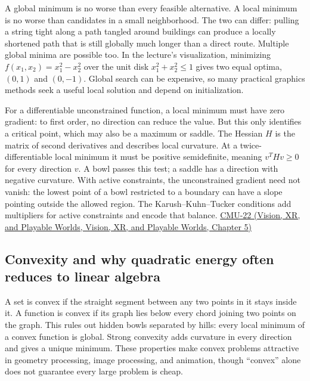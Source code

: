 A global minimum is no worse than every feasible alternative. A local minimum is no worse than candidates in a small neighborhood. The two can differ: pulling a string tight along a path tangled around buildings can produce a locally shortened path that is still globally much longer than a direct route. Multiple global minima are possible too. In the lecture's visualization, minimizing \(f(x_1,x_2)=x_1^2-x_2^2\) over the unit disk \(x_1^2+x_2^2\le1\) gives two equal optima, \((0,1)\) and \((0,-1)\). Global search can be expensive, so many practical graphics methods seek a useful local solution and depend on initialization.

For a differentiable unconstrained function, a local minimum must have zero gradient: to first order, no direction can reduce the value. But this only identifies a critical point, which may also be a maximum or saddle. The Hessian \(H\) is the matrix of second derivatives and describes local curvature. At a twice-differentiable local minimum it must be positive semidefinite, meaning \(v^T H v\ge0\) for every direction \(v\). A bowl passes this test; a saddle has a direction with negative curvature. With active constraints, the unconstrained gradient need not vanish: the lowest point of a bowl restricted to a boundary can have a slope pointing outside the allowed region. The Karush--Kuhn--Tucker conditions add multipliers for active constraints and encode that balance. \href{../07-Vision-XR-and-Playable-Worlds/main.pdf\#nameddest=04-visual-computing-ii-ch036-cmu-22---optimization}{CMU-22 (Vision, XR, and Playable Worlds, Vision, XR, and Playable Worlds, Chapter 5)}

\subsection{Convexity and why quadratic energy often reduces to linear algebra}\label{04-visual-computing-ii-ch029-convexity-and-why-quadratic-energy-often-reduces-to-linear-algebra}

A set is convex if the straight segment between any two points in it stays inside it. A function is convex if its graph lies below every chord joining two points on the graph. This rules out hidden bowls separated by hills: every local minimum of a convex function is global. Strong convexity adds curvature in every direction and gives a unique minimum. These properties make convex problems attractive in geometry processing, image processing, and animation, though ``convex'' alone does not guarantee every large problem is cheap.

